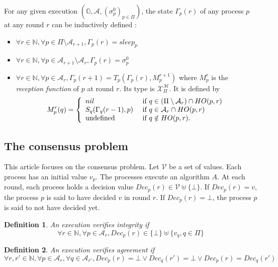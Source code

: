 \documentclass{article}
\newtheorem{definition}{Definition}
\begin{document}
For any given execution $(\mathds{G}, \mathcal{A}, (\sigma^0_p)_{p \in \Pi})$,
the state $\Gamma_p(r)$ of any process $p$ at any round $r$ can be inductively defined :

\begin{itemize}
	\item $\forall r \in \mathds{N}, \forall p \in \Pi \setminus \mathcal{A}_{r+1}, \Gamma_p(r) = sleep_p$
	\item $\forall r \in \mathds{N}, \forall p \in \mathcal{A}_{r+1} \setminus \mathcal{A}_r,
		\Gamma_p(r) = \sigma^0_p$
	\item $\forall r \in \mathds{N}, \forall p \in \mathcal{A}_r, \Gamma_p(r+1) = T_p(\Gamma_p(r), M_p^{r+1})$
		where $M_p^r$ is the \textit{reception function} of $p$ at round $r$.
		Its type is $\mathcal{X}_\Pi^{\mathcal{M}}$.
		It is defined by
			$$ M_p^r(q) = \left \{ \begin{array}{l l}
	                         nil  & \mbox{ if  } q \in (\Pi \setminus \mathcal{A}_r  ) \cap  HO(p,r)  \\
	                         S_q (\Gamma_q(r-1), p)  & \mbox{ if  }   q \in \mathcal{A}_r  \cap  HO(p,r) \\
	                         \mbox{undefined} & \mbox{ if  }   q \notin  HO(p,r) .
	                          \end{array} \right.$$ 
\end{itemize}

\subsection{The consensus problem}

This article focuses on the consensus problem. Let $\mathcal{V}$ be a set of values. Each process has an 
initial value $v_p$. The processes execute an algorithm $A$. At each round, each process holds a decision value
$Dec_p(r) \in \mathcal{V} \uplus \{\bot\}$. If $Dec_p(r) = v$, the process $p$ is said to have decided $v$
in round $r$. If $Dec_p(r) = \bot$, the process $p$ is said to not have decided yet.

\begin{definition}
	An execution verifies integrity if 
	$$\forall r \in \mathds{N}, \forall p \in \mathcal{A}_r, Dec_p(r) \in \{\bot\} \uplus \{v_q, q \in \Pi\}$$
\end{definition}

\begin{definition}
	An execution verifies agreement if 
	$$\forall r, r' \in \mathds{N}, \forall p \in \mathcal{A}_r, \forall q \in \mathcal{A}_{r'},
	Dec_p(r) = \bot \vee Dec_q(r') = \bot \vee Dec_p(r) = Dec_q(r') $$
\end{definition}
\end{document}

